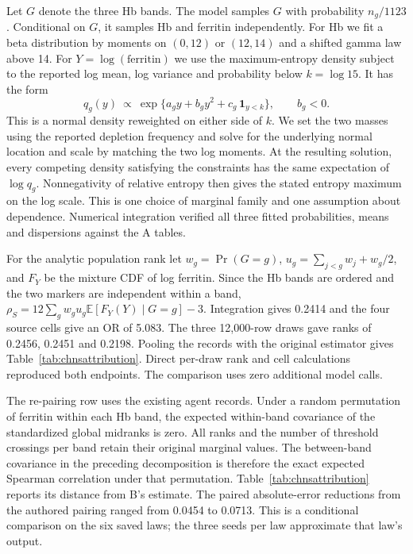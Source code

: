 Let $G$ denote the three Hb bands. The model samples $G$ with probability $n_g/1123$. Conditional on $G$, it samples Hb and ferritin independently. For Hb we fit a beta distribution by moments on $(0,12)$ or $(12,14)$ and a shifted gamma law above 14. For $Y=\log(\mathrm{ferritin})$ we use the maximum-entropy density subject to the reported log mean, log variance and probability below $k=\log 15$. It has the form
\[
q_g(y)\ \propto\ \exp\{a_g y+b_g y^2+c_g\,\mathbf{1}_{y<k}\},\qquad b_g<0 .
\]
This is a normal density reweighted on either side of $k$. We set the two masses using the reported depletion frequency and solve for the underlying normal location and scale by matching the two log moments. At the resulting solution, every competing density satisfying the constraints has the same expectation of $\log q_g$. Nonnegativity of relative entropy then gives the stated entropy maximum on the log scale. This is one choice of marginal family and one assumption about dependence. Numerical integration verified all three fitted probabilities, means and dispersions against the A tables.

For the analytic population rank let $w_g=\Pr(G=g)$, $u_g=\sum_{j<g}w_j+w_g/2$, and $F_Y$ be the mixture CDF of log ferritin. Since the Hb bands are ordered and the two markers are independent within a band, $\rho_S=12\sum_g w_g u_g \mathbb E[F_Y(Y)\mid G=g]-3$. Integration gives 0.2414 and the four source cells give an OR of 5.083. The three 12,000-row draws gave ranks of 0.2456, 0.2451 and 0.2198. Pooling the records with the original estimator gives Table~\ref{tab:chnsattribution}. Direct per-draw rank and cell calculations reproduced both endpoints. The comparison uses zero additional model calls.

The re-pairing row uses the existing agent records. Under a random permutation of ferritin within each Hb band, the expected within-band covariance of the standardized global midranks is zero. All ranks and the number of threshold crossings per band retain their original marginal values. The between-band covariance in the preceding decomposition is therefore the exact expected Spearman correlation under that permutation. Table~\ref{tab:chnsattribution} reports its distance from B's estimate. The paired absolute-error reductions from the authored pairing ranged from 0.0454 to 0.0713. This is a conditional comparison on the six saved laws; the three seeds per law approximate that law's output.

